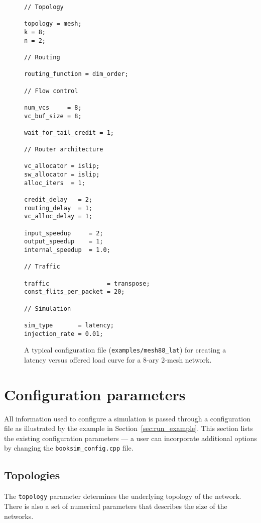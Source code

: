 \documentclass[11pt]{article}
\begin{document}
\begin{figure}
\begin{verbatim}
// Topology

topology = mesh;
k = 8;
n = 2;

// Routing

routing_function = dim_order;

// Flow control

num_vcs     = 8;
vc_buf_size = 8;

wait_for_tail_credit = 1;

// Router architecture

vc_allocator = islip;
sw_allocator = islip;
alloc_iters  = 1;

credit_delay   = 2;
routing_delay  = 1;
vc_alloc_delay = 1;

input_speedup     = 2;
output_speedup    = 1;
internal_speedup  = 1.0;

// Traffic

traffic                = transpose;
const_flits_per_packet = 20;

// Simulation

sim_type       = latency;
injection_rate = 0.01;
\end{verbatim}
\caption{A typical configuration file (\texttt{examples/mesh88\_lat})
for creating a latency versus offered load curve for a 8-ary 2-mesh
network.}
\label{fig:lat_vs_load}
\end{figure}

\section{Configuration parameters}
\label{sec:config_params}

All information used to configure a simulation is passed through a
configuration file as illustrated by the example in
Section~\ref{sec:run_example}.  This section lists the existing
configuration parameters --- a user can incorporate additional options
by changing the \texttt{booksim\_config.cpp} file.

\subsection{Topologies}
\label{sec:topos}

The \texttt{topology} parameter determines the underlying topology of the
network. There is also a set of numerical parameters that describes the size of the networks. 
\end{document}
